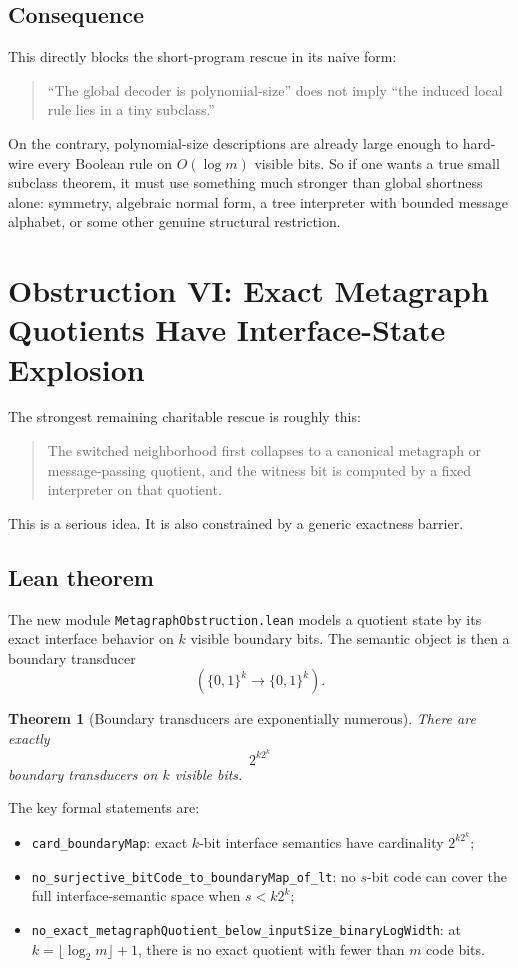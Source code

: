 \documentclass[11pt]{article}
\newtheorem{theorem}{Theorem}[section]
\theoremstyle{remark}
\begin{document}
\subsection{Consequence}

This directly blocks the short-program rescue in its naive form:

\begin{quote}
``The global decoder is polynomial-size'' does not imply
``the induced local rule lies in a tiny subclass.''
\end{quote}

On the contrary, polynomial-size descriptions are already large enough to hard-wire every Boolean
rule on \(O(\log m)\) visible bits.  So if one wants a true small subclass theorem, it must use
something much stronger than global shortness alone: symmetry, algebraic normal form, a tree
interpreter with bounded message alphabet, or some other genuine structural restriction.

\section{Obstruction VI: Exact Metagraph Quotients Have Interface-State Explosion}

The strongest remaining charitable rescue is roughly this:
\begin{quote}
The switched neighborhood first collapses to a canonical metagraph or message-passing quotient,
and the witness bit is computed by a fixed interpreter on that quotient.
\end{quote}

This is a serious idea.  It is also constrained by a generic exactness barrier.

\subsection{Lean theorem}

The new module \texttt{MetagraphObstruction.lean} models a quotient state by its exact interface
behavior on \(k\) visible boundary bits.  The semantic object is then a boundary transducer
\[
  (\{0,1\}^k \to \{0,1\}^k).
\]

\begin{theorem}[Boundary transducers are exponentially numerous]
There are exactly
\[
  2^{k 2^k}
\]
boundary transducers on \(k\) visible bits.
\end{theorem}

\noindent
The key formal statements are:
\begin{itemize}[leftmargin=1.5em]
  \item \texttt{card\_boundaryMap}: exact \(k\)-bit interface semantics have cardinality
  \(2^{k2^k}\);
  \item \texttt{no\_surjective\_bitCode\_to\_boundaryMap\_of\_lt}: no \(s\)-bit code can cover the
  full interface-semantic space when \(s < k2^k\);
  \item \texttt{no\_exact\_metagraphQuotient\_below\_inputSize\_binaryLogWidth}: at
  \(k = \lfloor \log_2 m \rfloor + 1\), there is no exact quotient with fewer than \(m\) code bits.
\end{itemize}
\end{document}

